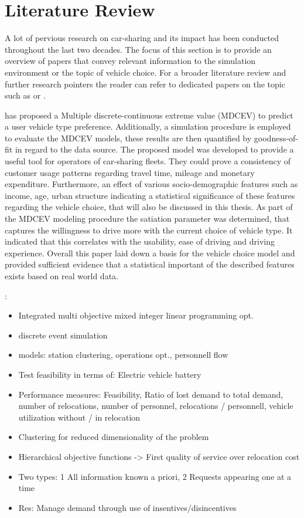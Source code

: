 \clearpage
\section{Literature Review}
\label{sec:lr}

A lot of pervious research on car-sharing and its impact has been conducted throughout
the last two decades. The focus of this section is to provide an overview of papers 
that convey relevant information to the simulation environment or the topic of vehicle
choice. For a broader literature review and further research pointers the reader can 
refer to dedicated papers on the topic such as  or .

 has proposed a Multiple discrete-continuous extreme value (MDCEV) to predict 
a user vehicle type preference. Additionally, a simulation procedure is employed to evaluate the MDCEV
models, these results are then quantified by goodness-of-fit in regard to the data source.
The proposed model was developed to provide a useful tool for operators of car-sharing fleets.
They could prove a consistency of customer usage patterns regarding travel time, mileage and
monetary expenditure. Furthermore, an effect of various socio-demographic features such
as income, age, urban structure indicating a statistical significance of these features
regarding the vehicle choice, that will also be discussed in this thesis.
As part of the MDCEV modeling procedure the satiation parameter was determined, that captures
the willingness to drive more with the current choice of vehicle type. It indicated that this
correlates with the usability, ease of driving and driving experience. Overall this paper
laid down a basis for the vehicle choice model and provided sufficient evidence that
a statistical important of the described features exists based on real world data.

\cite{OptSimFramework}:
\begin{itemize}
    \item Integrated multi objective mixed integer linear programming opt.
    \item discrete event simulation
    \item models: station clustering, operations opt., personnell flow 
    \item Test feasibility in terms of: Electric vehicle battery
    \item Performance measures: Feasibility, Ratio of lost demand to total demand, number of relocations, number of personnel, relocations / personnell, vehicle utilization without / in relocation
    \item Clustering for reduced dimensionality of the problem 
    \item Hierarchical objective functions -> First quality of service over relocation cost
    \item Two types: 1 All information known a priori, 2 Requests appearing one at a time
    \item Res: Manage demand through use of insentives/disincentives 
\end{itemize}
    
